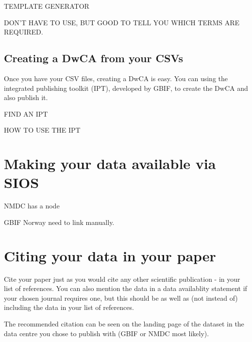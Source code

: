 \documentclass[a4paper,english, 11pt]{article}
\begin{document}
TEMPLATE GENERATOR

DON'T HAVE TO USE, BUT GOOD TO TELL YOU WHICH TERMS ARE REQUIRED.

\subsection{Creating a DwCA from your CSVs}
\label{ss:csv2dwca}

Once you have your CSV files, creating a DwCA is easy. You can using the integrated publishing toolkit (IPT), developed by GBIF, to create the DwCA and also publish it.

FIND AN IPT

HOW TO USE THE IPT

\section{Making your data available via SIOS}
\label{s:sios}

NMDC has a node

GBIF Norway need to link manually.

\section{Citing your data in your paper}
\label{s:citing}

Cite your paper just as you would cite any other scientific publication - in your list of references. You can also mention the data in a data availablity statement if your chosen journal requires one, but this should be as well as (not instead of) including the data in your list of references.

The recommended citation can be seen on the landing page of the dataset in the data centre you chose to publish with (GBIF or NMDC most likely).
\end{document}
